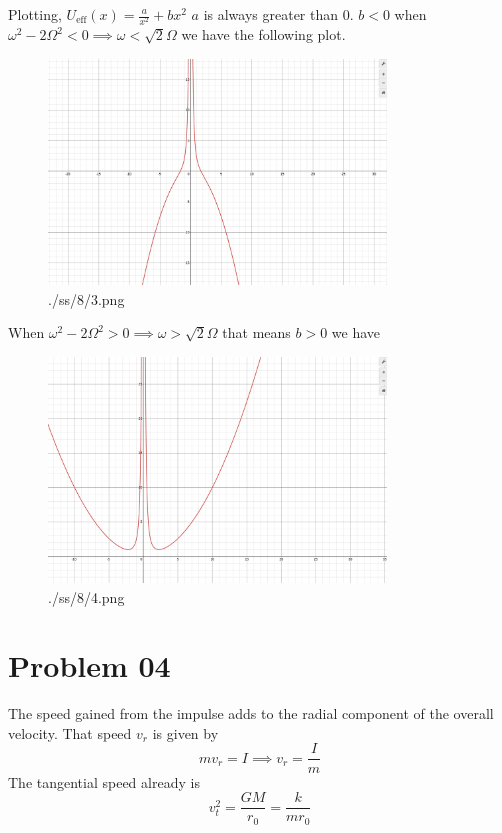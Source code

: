 \documentclass[letter, 10pts]{article}
\begin{document}
Plotting, $U_\text{eff} (x)= \frac{a}{x^2} + b x^2 $
$a$ is always greater than $0$. $b < 0$ when $\omega^2 - 2 \Omega^2 < 0 \implies \omega < \sqrt{2}  \Omega$ we have the following plot. 
\begin{figure}[H]
	\centering
	\includegraphics[width=0.8\textwidth]{./ss/8/3.png}
	\caption{./ss/8/3.png}
	\label{fig:-ss-8-3-png}
\end{figure}
When $\omega^2 - 2 \Omega^2 > 0 \implies \omega > \sqrt{2} \Omega$ that means $b>0$ we have 
\begin{figure}[H]
	\centering
	\includegraphics[width=0.8\textwidth]{./ss/8/4.png}
	\caption{./ss/8/4.png}
	\label{fig:-ss-8-4-png}
\end{figure}

\section*{Problem 04} 
The speed gained from the impulse adds to the radial component of the overall velocity. That speed $v_r$ is given by 
\[
m v_r = {I}\implies v_r = \frac{I}{m}
\]
The tangential speed already is 
\[
	v_t ^2 = \frac{GM}{r_0} = \frac{k}{mr_0 }
\] 
\end{document}
